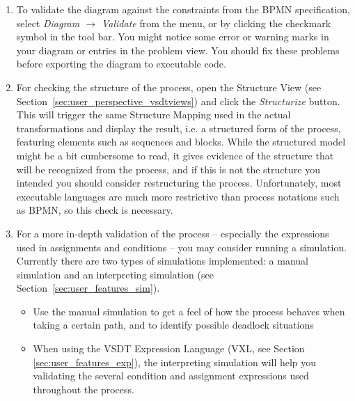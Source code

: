 \begin{enumerate}

	\item To validate the diagram against the constraints from the BPMN
	specification, select \emph{Diagram $\rightarrow$ Validate} from the menu, or
	by clicking the checkmark symbol in the tool bar.  You might notice some error
	or warning marks in your diagram or entries in the problem view.  You should
	fix these problems before exporting the diagram to executable code.
	
	\item For checking the structure of the process, open the Structure View (see
	Section~\ref{sec:user_perspective_vsdtviews}) and click the \emph{Structurize}
	button.  This will trigger the same Structure Mapping used in the actual
	transformations and display the result, i.e. a structured form of the process,
	featuring elements such as sequences and blocks.  While the structured model
	might be a bit cumbersome to read, it gives evidence of the structure that
	will be recognized from the process, and if this is not the structure you
	intended you should consider restructuring the process.  Unfortunately, most
	executable languages are much more restrictive than process notations such as
	BPMN, so this check is necessary.
	
	\item For a more in-depth validation of the process -- especially the expressions
	used in assignments and conditions -- you may consider running a simulation.
	Currently there are two types of simulations implemented: a manual simulation
	and an interpreting simulation (see Section~\ref{sec:user_features_sim}).
	\begin{itemize}
		\item Use the manual simulation to get a feel of how the process behaves
		when taking a certain path, and to identify possible deadlock situations
		
		\item When using the VSDT Expression Language (VXL, see Section
		\ref{sec:user_features_exp}), the interpreting simulation will help you
		validating the several condition and assignment expressions used throughout
		the process.
	\end{itemize}

\end{enumerate}



